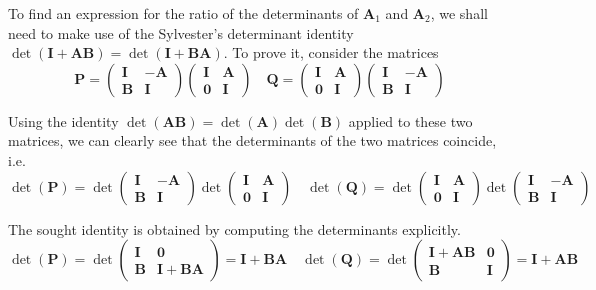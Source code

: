 To find an expression for the ratio of the determinants of $\bm A_1$ and $\bm A_2$, we shall need to make use of the Sylvester's determinant identity $\det(\bm I + \bm A \bm B ) = \det (\bm I + \bm B \bm A )$.
To prove it, consider the matrices
\begin{equation}
\bm P =
\begin{pmatrix}
\bm I & - \bm A \\
\bm B & \bm I 
\end{pmatrix}
\begin{pmatrix}
\bm I &  \bm A \\
\bm 0 & \bm I 
\end{pmatrix}
\quad
\bm Q =
\begin{pmatrix}
\bm I &  \bm A \\
\bm 0 & \bm I 
\end{pmatrix}
\begin{pmatrix}
\bm I &  -\bm A \\
\bm B & \bm I 
\end{pmatrix}
\end{equation}

Using the identity $\det ( \bm A \bm B ) = \det ( \bm A ) \det ( \bm B )$ applied to these two matrices, we can clearly see that the determinants of the two matrices coincide, i.e.
\begin{equation}
\det ( \bm P) = \det
\begin{pmatrix}
\bm I & -\bm A \\
\bm B & \bm I
\end{pmatrix}
\det
\begin{pmatrix}
\bm I & \bm A \\
\bm 0 & \bm I
\end{pmatrix}
\quad
\det (\bm Q) = \det
\begin{pmatrix}
\bm I & \bm A \\
\bm 0 & \bm I
\end{pmatrix}
\det
\begin{pmatrix}
\bm I & -\bm A \\
\bm B & \bm I
\end{pmatrix}
\end{equation}

The sought identity is obtained by computing the determinants explicitly.
\begin{equation}
\det ( \bm P ) = \det
\begin{pmatrix}
\bm I & \bm 0 \\
\bm B & \bm I + \bm B \bm A 
\end{pmatrix}
= \bm I + \bm B \bm A 
\quad
\det ( \bm Q ) = \det
\begin{pmatrix}
\bm I + \bm A \bm B & \bm 0 \\
\bm B & \bm I
\end{pmatrix}
= \bm I + \bm A \bm B
\end{equation}

